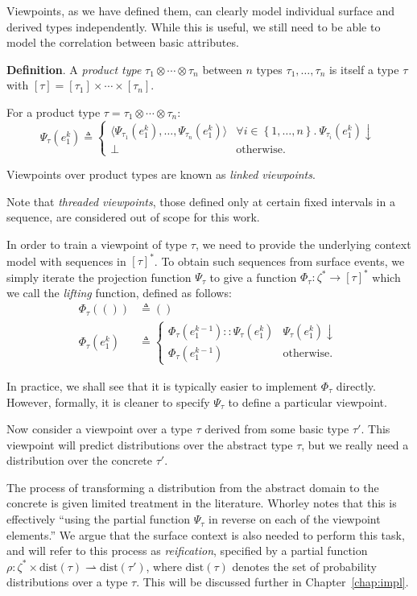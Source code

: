 \documentclass[12pt,a4paper,twoside,openright]{report}
\newcommand{\set}[1]{ \left\{ #1 \right\} }
\begin{document}
Viewpoints, as we have defined them, can clearly model individual surface and
derived types independently. While this is useful, we still need to be able to
model the correlation between basic attributes.

\textbf{Definition}. A \emph{product type} $\tau_1 \otimes \cdots \otimes
\tau_n$ between $n$ types $\tau_1, \ldots, \tau_n$ is itself a type $\tau$ with
$[\tau] = [\tau_1] \times \cdots \times [\tau_n]$. 

For a product type $\tau = \tau_1 \otimes \cdots \otimes \tau_n$:
$$ \Psi_\tau(e_1^k) \triangleq
\begin{cases}
  \langle\Psi_{\tau_1}(e_1^k), \ldots, \Psi_{\tau_n}(e_1^k)\rangle & \forall i
  \in \set{1,\ldots,n}.\
  \Psi_{\tau_i}(e_1^k)\downarrow \\
  \bot & \text{otherwise.}
\end{cases}
$$

Viewpoints over product types are known as \emph{linked viewpoints}. 

Note that \emph{threaded viewpoints}, those defined only at certain fixed
intervals in a sequence, are considered out of scope for this work.

In order to train a viewpoint of type $\tau$, we need to provide the
underlying context model with sequences in $[\tau]^*$. To obtain such sequences
from surface events, we simply iterate the projection function $\Psi_\tau$ to
give a function $\Phi_\tau : \zeta^* \rightarrow [\tau]^*$ which we call the
\emph{lifting} function, defined as follows:
\begin{align*}
  \Phi_\tau(()) &\triangleq () \\
  \Phi_\tau(e_1^k) &\triangleq \begin{cases}
    \Phi_\tau(e_1^{k-1})::\Psi_\tau(e_1^k) & \Psi_\tau(e_1^k)\downarrow \\
    \Phi_\tau(e_1^{k-1}) & \text{otherwise.}
  \end{cases}
\end{align*}

In practice, we shall see that it is typically easier to implement $\Phi_\tau$
directly. However, formally, it is cleaner to specify $\Psi_\tau$ to define a
particular viewpoint.

Now consider a viewpoint over a type $\tau$ derived from some basic type
$\tau'$. This viewpoint will predict distributions over the abstract type
$\tau$, but we really need a distribution over the concrete $\tau'$. 

The process of transforming a distribution from the abstract domain to the
concrete is given limited treatment in the literature. Whorley
\cite{whorley2013phd} notes that this is effectively ``using the partial
function $\Psi_\tau$ in reverse on each of the viewpoint elements.'' We argue
that the surface context is also needed to perform this task, and will refer to
this process as \emph{reification}, specified by a partial function $\rho :
\zeta^* \times \mathrm{dist}(\tau) \rightharpoonup \mathrm{dist}(\tau')$, where
$\mathrm{dist}(\tau)$ denotes the set of probability distributions over a type
$\tau$. This will be discussed further in Chapter~\ref{chap:impl}.
\end{document}
